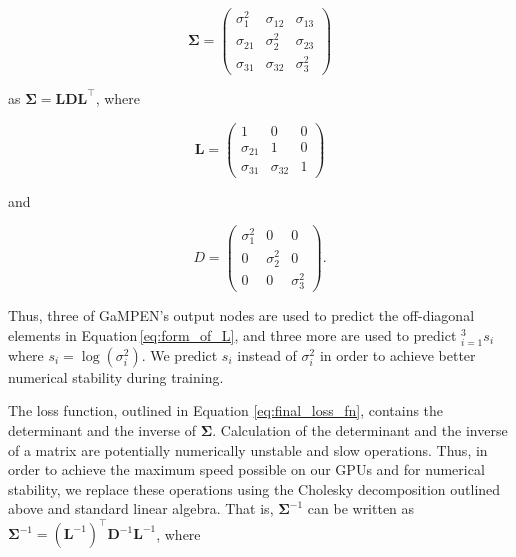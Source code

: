 \documentclass[twocolumn]{aastex63}
\newcommand\gampen{GaMPEN}
\begin{document}
\begin{CJK*}{UTF8}{gbsn}
\begin{equation}
\boldsymbol{\Sigma} = \left(\begin{array}{ccc}
\sigma_{1}^{2} & \sigma_{12} & \sigma_{13} \\
\sigma_{21} & \sigma_{2}^{2} & \sigma_{23} \\
\sigma_{31} & \sigma_{32} & \sigma_{3}^{2}
\end{array}\right)
\label{eq:full_sigma_matrix}
\end{equation}

\noindent
as $\boldsymbol{\Sigma} = \boldsymbol{L}\boldsymbol{D}\boldsymbol{L}^{\top}$, where 

\begin{equation}
\boldsymbol{L} = \left(\begin{array}{lll}
1 & 0 & 0 \\
\sigma_{21} & 1 & 0 \\
\sigma_{31} & \sigma_{32} & 1
\end{array}\right)
\label{eq:form_of_L}
\end{equation}

\noindent
and 

\begin{equation}
D=\left(\begin{array}{ccc}
\sigma_{1}^{2} & 0 & 0 \\
0 & \sigma_{2}^{2} & 0 \\
0 & 0 & \sigma_{3}^{2}
\end{array}\right) .
\label{eq:form_of_D}
\end{equation}

\noindent
Thus, three of \gampen{}'s output nodes are used to predict the off-diagonal elements in Equation\,\ref{eq:form_of_L},
and three more are used to predict $_{i=1}^3s_i$ where $s_i=\log(\sigma_i^2)$. We predict $s_i$ instead of $\sigma_i^2$ in order to achieve better numerical stability during training. 

The loss function, outlined in Equation \ref{eq:final_loss_fn}, contains the determinant and the inverse of $\boldsymbol{\Sigma}$. Calculation of the determinant and the inverse of a matrix are potentially numerically unstable and slow operations. Thus, in order to achieve the maximum speed possible on our GPUs and for numerical stability, we replace these operations using the Cholesky decomposition outlined above and standard linear algebra. 
That is, $\boldsymbol{\Sigma}^{-1}$ can be written as $\boldsymbol{\Sigma}^{-1}=\left(\boldsymbol{L}^{-1}\right)^{\top} \boldsymbol{D}^{-1} \boldsymbol{L}^{-1}$, where 


\end{CJK*}
\end{document}
